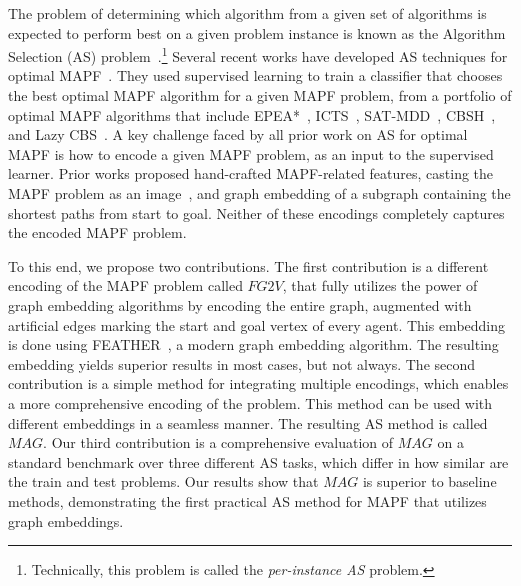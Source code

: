 \documentclass{ecai}
\newcommand{\Carmel}[1]{}
\newcommand{\Roni}[1]{}
\newcommand{\fgtv}[1]{\ensuremath{\textit{FG2V}}\xspace}
\newcommand{\mapfgas}[1]{\ensuremath{\textit{MAG}}\xspace}
\begin{document}
The problem of determining which algorithm from a given set of algorithms is expected to perform best on a given problem instance is known as the 
Algorithm Selection (AS) problem~\cite{rice1976algorithm,kerschke2019automated}.\footnote{Technically, this problem is called the \emph{per-instance AS} problem.}
Several recent works have developed AS techniques for optimal MAPF~\cite{kaduri2020algorithm,ren2021mapfast,alkazzi2022mapfaster}. 
They used supervised learning to
train a classifier that chooses the best optimal MAPF algorithm for a given MAPF problem, from a portfolio of optimal MAPF algorithms that include EPEA*~\cite{goldenberg2014enhanced}, ICTS~\cite{sharon2013increasing}, SAT-MDD~\cite{surynek2016efficient}, CBSH~\cite{felner2018adding}, and Lazy CBS~\cite{gange2019lazy}.  
A key challenge faced by all prior work on AS for optimal MAPF is how to encode a given MAPF problem, as an input to the supervised learner. Prior works proposed hand-crafted MAPF-related features, casting the MAPF problem as an image~\cite{alkazzi2022mapfaster}, and graph embedding of a subgraph containing the shortest paths from start to goal. Neither of these encodings completely captures the encoded MAPF problem.



To this end, we propose two contributions.
The first contribution is a different encoding of the MAPF problem called \fgtv\ , that fully utilizes the power of graph embedding algorithms by encoding the entire graph, augmented with artificial edges marking the start and goal vertex of every agent. 
This embedding is done using FEATHER~\cite{rozemberczki2020characteristic}, a modern graph embedding algorithm. %
The resulting embedding yields superior results in most cases, but not always. 
The second contribution is a simple method for integrating multiple encodings, which enables a more comprehensive encoding of the problem. This method can be used with different embeddings in a seamless manner. The resulting AS method is called \mapfgas\ . 
Our third contribution is a comprehensive evaluation of \mapfgas\ on a standard benchmark over three different AS tasks, which differ in how similar are the train and test problems. Our results show that \mapfgas\ is superior to baseline methods, demonstrating the first practical AS method for MAPF that utilizes graph embeddings. 
\end{document}

